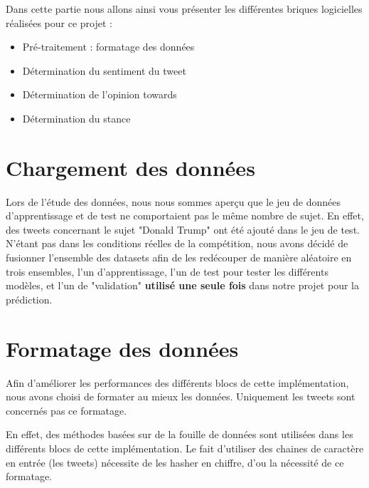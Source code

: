 \par Dans cette partie nous allons ainsi vous présenter les  différentes briques logicielles réalisées pour ce projet : \\

\begin{itemize}
	\item Pré-traitement : formatage des données
	\item Détermination du sentiment du tweet
	\item Détermination de l'opinion towards
	\item Détermination du stance \\
\end{itemize}

\section{Chargement des données}

Lors de l'étude des données, nous nous sommes aperçu que le jeu de données d'apprentissage et de test ne comportaient pas le même nombre de sujet. En effet, des tweets concernant le sujet "Donald Trump" ont été ajouté dans le jeu de test. \\

N'étant pas dans les conditions réelles de la compétition, nous avons décidé de fusionner l'ensemble des datasets afin de les redécouper de manière aléatoire en trois ensembles, l'un d'apprentissage, l'un de test pour tester les différents modèles, et l'un de "validation" \textbf{utilisé une seule fois} dans notre projet pour la prédiction.


\section{Formatage des données}
\par Afin d'améliorer les performances des différents blocs de cette implémentation, nous avons choisi de formater au mieux les données. Uniquement les tweets sont concernés pas ce formatage.
\par En effet, des méthodes basées sur de la fouille de données sont utilisées dans les différents blocs de cette implémentation. Le fait d'utiliser des chaines de caractère en entrée (les tweets) nécessite de les hasher en chiffre, d'ou la nécessité de ce formatage.

